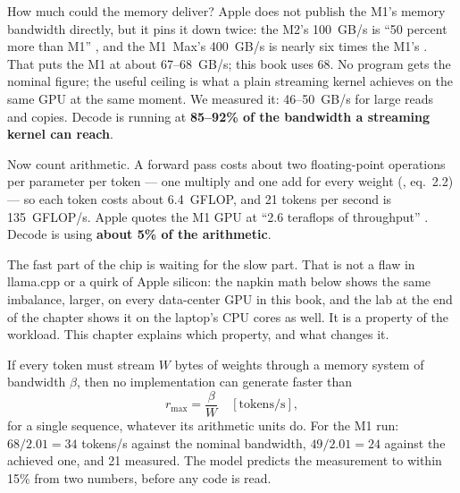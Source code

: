 How much could the memory deliver? Apple does not publish the M1's memory
bandwidth directly, but it pins it down twice: the M2's 100~GB/s is ``50
percent more than M1'' \cite{apple2022m2}, and the M1~Max's 400~GB/s is nearly
six times the M1's \cite{apple2021m1pro}. That puts the M1 at about 67--68~GB/s;
this book uses 68. No program gets the nominal figure; the useful ceiling is
what a plain streaming kernel achieves on the same GPU at the same moment. We
measured it: 46--50~GB/s for large reads and copies. Decode is running at
\textbf{85--92\% of the bandwidth a streaming kernel can reach}.

Now count arithmetic. A forward pass costs about two floating-point operations
per parameter per token --- one multiply and one add for every weight
(\cite{kaplan2020scaling}, eq.~2.2) --- so each token costs about 6.4~GFLOP,
and 21 tokens per second is 135~GFLOP/s. Apple quotes the M1 GPU at ``2.6
teraflops of throughput'' \cite{apple2020m1}. Decode is using \textbf{about 5\%
of the arithmetic}.

The fast part of the chip is waiting for the slow part. That is not a flaw in
llama.cpp or a quirk of Apple silicon: the napkin math below shows the same
imbalance, larger, on every data-center GPU in this book, and the lab at the
end of the chapter shows it on the laptop's CPU cores as well. It is a property
of the workload. This chapter explains which property, and what changes it.



If every token must stream $W$ bytes of weights through a memory system of
bandwidth $\beta$, then no implementation can generate faster than
\begin{equation}
r_{\max} = \frac{\beta}{W}\quad[\text{tokens/s}],
\label{eq:decode-ceiling}
\end{equation}
for a single sequence, whatever its arithmetic units do. For the M1 run:
$68/2.01 = 34$ tokens/s against the nominal bandwidth, $49/2.01 = 24$ against
the achieved one, and 21 measured. The model predicts the measurement to
within 15\% from two numbers, before any code is read.

